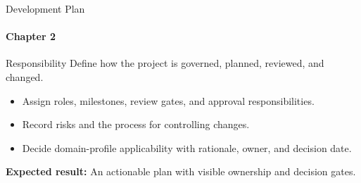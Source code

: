 \begin{frame}{Development Plan}
\framesubtitle{Chapter 2}
\begin{block}{Responsibility}
Define how the project is governed, planned, reviewed, and changed.
\end{block}
\begin{itemize}
  \item Assign roles, milestones, review gates, and approval responsibilities.
  \item Record risks and the process for controlling changes.
  \item Decide domain-profile applicability with rationale, owner, and decision date.
\end{itemize}
\vspace{0.15cm}
\textbf{Expected result:} An actionable plan with visible ownership and decision gates.
\end{frame}
